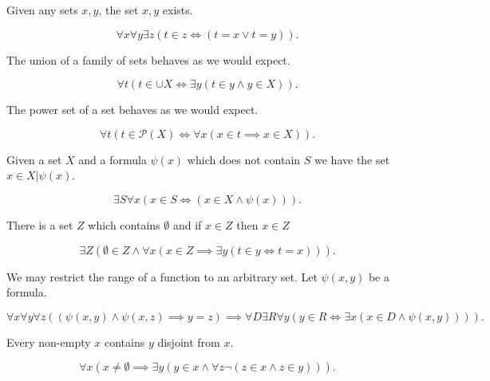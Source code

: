 \documentclass[]{article}
\begin{document}
\begin{axiom} [Pairing]
		Given any sets $x, y$, the set ${x,y}$ exists.

		\[
				\forall x \forall y \exists z (t \in z \iff (t = x \lor t = y))
		.\] 
\end{axiom}

\begin{axiom} [Union]
	The union of a family of sets behaves as we would expect.

	\[
			\forall t (t \in \cup X \iff \exists y (t \in y \land y \in X))	
	.\] 
\end{axiom}

\begin{axiom} 
	The power set of a set behaves as we would expect.

	\[
			\forall t (t \in \mathcal{P}(X) \iff \forall x (x \in t \implies x \in X))			
	.\] 
\end{axiom}

\begin{axiom} [Separation]
		Given a set $X$ and a formula $\psi(x)$	which does not contain $S$ we have the set ${x \in X | \psi(x)}$.

		 \[
				 \exists S \forall x (x \in S \iff (x \in X \land \psi(x)))
		.\] 
\end{axiom}

\begin{axiom} [Infinity]
		There is a set $Z$ which contains $\emptyset$ and if $x \in Z$ then ${x} \in Z$	

		\[
				\exists Z(\emptyset \in Z \land \forall x(x \in Z \implies \exists y(t \in y \iff t = x)))
		.\] 
\end{axiom}

\begin{axiom} [Replacement]
	We may restrict the range of a function to an arbitrary set.
	Let $\psi(x,y)$ be a formula.

	\[
			\forall x \forall y \forall z ((\psi(x,y) \land \psi(x,z) \implies y = z) \implies \forall D \exists R \forall y (y \in R \iff \exists x (x \in D \land \psi(x,y))))
	.\] 
\end{axiom}

\begin{axiom} [Regularity]
	Every non-empty $x$ contains $y$ disjoint from $x$.

	\[
			\forall x (x \neq \emptyset \implies \exists y (y \in x \land \forall z \lnot (z \in x \land z \in y)))
	.\] 
\end{axiom}
\end{document}
